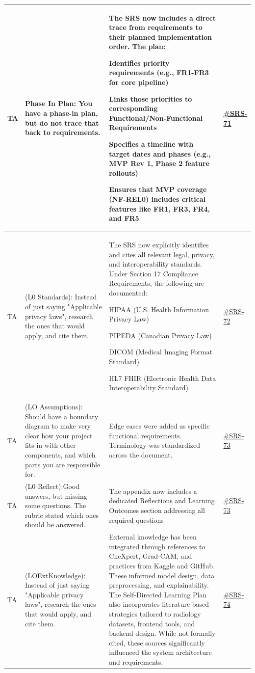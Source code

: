 \documentclass{article}
\begin{document}
\begin{longtable}{|p{1.48cm}|p{5cm}|p{4.7cm}|p{1cm}|}
TA & Phase In Plan: You have a phase-in plan, but do not trace that back to requirements. & The SRS now includes a direct trace from requirements to their planned implementation order. The plan:

Identifies priority requirements (e.g., FR1-FR3 for core pipeline)

Links those priorities to corresponding Functional/Non-Functional Requirements

Specifies a timeline with target dates and phases (e.g., MVP Rev 1, Phase 2 feature rollouts)

Ensures that MVP coverage (NF-REL0) includes critical features like FR1, FR3, FR4, and FR5 &\href{https://github.com/harrisonchiu/xray/issues/71}{\#SRS-71} \\
\hline

TA & (L0 Standards): Instead of just saying "Applicable privacy laws", research the ones that would apply, and cite them. & The SRS now explicitly identifies and cites all relevant legal, privacy, and interoperability standards. Under Section 17 Compliance Requirements, the following are documented:

HIPAA (U.S. Health Information Privacy Law)

PIPEDA (Canadian Privacy Law)

DICOM (Medical Imaging Format Standard)

HL7 FHIR (Electronic Health Data Interoperability Standard)&\href{https://github.com/harrisonchiu/xray/issues/72}{\#SRS-72} \\
\hline

TA & (LO Assumptions): Should have a boundary diagram to make very clear how your project fits in with other components, and which parts you are responsible for. & Edge cases were added as specific functional requirements. Terminology was standardized across the document. &\href{https://github.com/harrisonchiu/xray/issues/73}{\#SRS-73} \\
\hline
TA & (L0 Reflect):Good answers, but missing some questions. The rubric stated which ones should be answered. & The appendix now includes a dedicated Reflections and Learning Outcomes section addressing all required questions &\href{https://github.com/harrisonchiu/xray/issues/73}{\#SRS-73} \\
\hline
TA & (LOExtKnowledge): Instead of just saying "Applicable privacy laws", research the ones that would apply, and cite them. & External knowledge has been integrated through references to CheXpert, Grad-CAM, and practices from Kaggle and GitHub. These informed model design, data preprocessing, and explainability. The Self-Directed Learning Plan also incorporates literature-based strategies tailored to radiology datasets, frontend tools, and backend design. While not formally cited, these sources significantly influenced the system architecture and requirements. &\href{https://github.com/harrisonchiu/xray/issues/74}{\#SRS-74} \\
\hline


\end{longtable}
\end{document}
